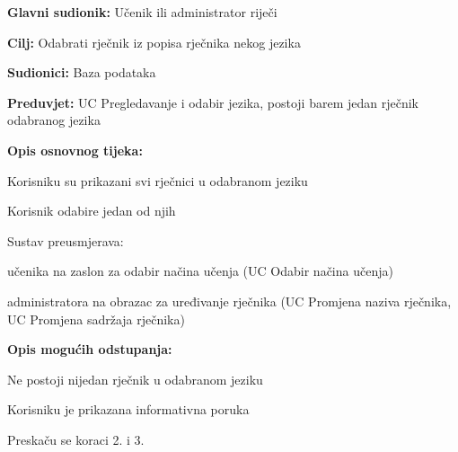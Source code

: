 					\noindent {}
					\begin{packed_item}

						\item \textbf{Glavni sudionik: } Učenik ili administrator riječi
						\item \textbf{Cilj: } Odabrati rječnik iz popisa rječnika nekog jezika
						\item \textbf{Sudionici: } Baza podataka
						\item \textbf{Preduvjet: } UC Pregledavanje i odabir jezika, postoji barem jedan rječnik odabranog jezika
						\item  \textbf{Opis osnovnog tijeka:}
						
						\item[] \begin{packed_enum}
							
							\item Korisniku su prikazani svi rječnici u odabranom jeziku
							\item Korisnik odabire jedan od njih
							\item Sustav preusmjerava:
							\item[] \begin{packed_item}
							
								\item učenika na zaslon za odabir načina učenja (UC Odabir načina učenja)
								\item administratora na obrazac za uređivanje rječnika (UC Promjena naziva rječnika, UC Promjena sadržaja rječnika)
								
							\end{packed_item}

						\end{packed_enum}

						\item  \textbf{Opis mogućih odstupanja:}
						
						\item[] \begin{packed_item}

							\item[1.a] Ne postoji nijedan rječnik u odabranom jeziku
							\item[] \begin{packed_enum}
								
								\item Korisniku je prikazana informativna poruka
								\item Preskaču se koraci 2. i 3.
								

\end{packed_enum}
\end{packed_item}
\end{packed_item}
